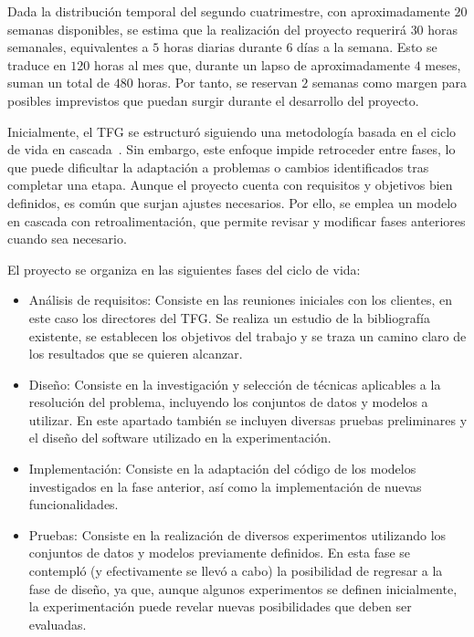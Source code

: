 Dada la distribución temporal del segundo cuatrimestre, con aproximadamente $20$ semanas disponibles, se estima que la realización del proyecto requerirá $30$ horas semanales, equivalentes a $5$ horas diarias durante $6$ días a la semana. Esto se traduce en $120$ horas al mes que, durante un lapso de aproximadamente $4$ meses, suman un total de $480$ horas. Por tanto, se reservan $2$ semanas como margen para posibles imprevistos que puedan surgir durante el desarrollo del proyecto.\newline

Inicialmente, el TFG se estructuró siguiendo una metodología basada en el ciclo de vida en cascada~\cite{Pressman1994}. Sin embargo, este enfoque impide retroceder entre fases, lo que puede dificultar la adaptación a problemas o cambios identificados tras completar una etapa. Aunque el proyecto cuenta con requisitos y objetivos bien definidos, es común que surjan ajustes necesarios. Por ello, se emplea un modelo en cascada con retroalimentación, que permite revisar y modificar fases anteriores cuando sea necesario.\newline

El proyecto se organiza en las siguientes fases del ciclo de vida:

\begin{itemize}
    \item Análisis de requisitos: Consiste en las reuniones iniciales con los clientes, en este caso los directores del TFG. Se realiza un estudio de la bibliografía existente, se establecen los objetivos del trabajo y se traza un camino claro de los resultados que se quieren alcanzar.
    \item Diseño: Consiste en la investigación y selección de técnicas aplicables a la resolución del problema, incluyendo los conjuntos de datos y modelos a utilizar. En este apartado también se incluyen diversas pruebas preliminares y el diseño del software utilizado en la experimentación.
    \item Implementación: Consiste en la adaptación del código de los modelos investigados en la fase anterior, así como la implementación de nuevas funcionalidades.
    \item Pruebas: Consiste en la realización de diversos experimentos utilizando los conjuntos de datos y modelos previamente definidos. En esta fase se contempló (y efectivamente se llevó a cabo) la posibilidad de regresar a la fase de diseño, ya que, aunque algunos experimentos se definen inicialmente, la experimentación puede revelar nuevas posibilidades que deben ser evaluadas.
\end{itemize}

